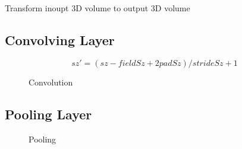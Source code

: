 \documentclass[a4paper]{report}
\begin{document}
Transform inoupt 3D volume to output 3D volume
\subsection{Convolving Layer}
$$
sz'= (sz-fieldSz+2padSz)/strideSz+1
$$

\begin{figure}[!htp]
\centering
{}
\caption{Convolution}
\label{fig:convolve}
\end{figure}
\subsection{Pooling Layer}
\begin{figure}[!htp]
\centering
{}
\caption{Pooling}
\label{fig:pooling}
\end{figure}
\end{document}
